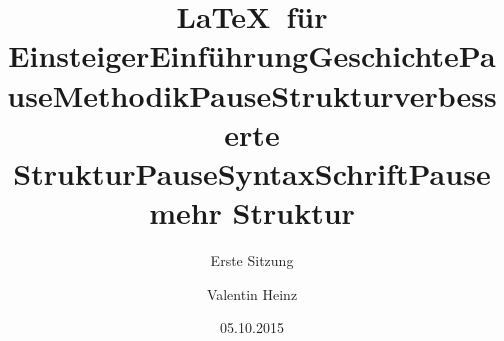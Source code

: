 \documentclass[]{beamer}
\title{\LaTeX \ für Einsteiger}
\author{Valentin Heinz}
\date{05.10.2015}
\subtitle{Erste Sitzung}
\begin{document}
\maketitle
\title{Einführung}


\title{Geschichte}


\title{Pause}


\title{Methodik}


\title{Pause}


\title{Struktur}


\title{verbesserte Struktur}


\title{Pause}


\title{Syntax}

\title{Schrift}


\title{Pause}


\title{mehr Struktur}

\end{document}
